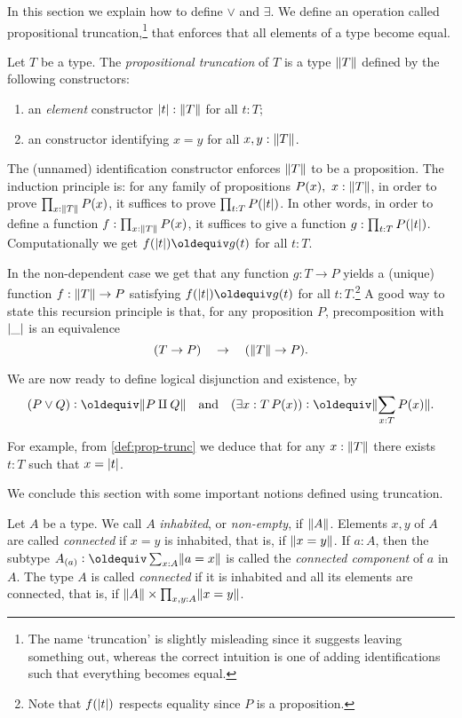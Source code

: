 In this section we explain how to define $\vee$ and $\exists$.
We define an operation called propositional truncation,\footnote{%
The name `truncation' is slightly misleading since it suggests leaving
something out, whereas the correct intuition is one of adding identifications
such that everything becomes equal.}
that enforces that all elements of a type become equal.

\begin{definition}\label{def:prop-trunc}
Let $T$ be a type. The \emph{propositional truncation} of $T$
is a type  $\lVert T\rVert$ defined by the following constructors:
\begin{enumerate}
\item an \emph{element} constructor $\lvert t\rvert : \lVert T\rVert$ for all $t:T$;
\item an constructor identifying $x=y$  for all $x,y:\lVert T\rVert$.
\end{enumerate}
The (unnamed) identification constructor enforces $\lVert T\rVert$ to be a
proposition. The induction principle is: 
for any family of propositions $P(x),~x:\lVert T\rVert$, 
in order to prove $\prod_{x:\lVert T\rVert} P(x)$,
it suffices to prove $\prod_{t:T} P(\lvert t\rvert)$. In other
words, in order to define a function $f:\prod_{x:\lVert T\rVert} P(x)$,
it suffices to give a function $g: \prod_{t:T} P(\lvert t\rvert)$.
Computationally we get $f(\trunc{t})\jdeq g(t)$ for all $t:T$. 
\end{definition}

In the non-dependent case we get that
any function $g: T\to P$ yields a (unique) function $f:\lVert T\rVert\to P$ 
satisfying $f(\trunc{t})\jdeq g(t)$ for all $t:T$.\footnote{%
Note that $f(\lvert t\rvert)$ respects equality since $P$ is a proposition.}
A good way to state this recursion principle is that, 
for any proposition $P$, precomposition with $\lvert\_\rvert$ is an equivalence
\[
(T \to P) \quad \to \quad (\lVert T\rVert \to P).
\]

We are now ready to define logical disjunction and existence, by
\[
(P \vee Q) \defeq \Trunc{P \amalg Q} \quad\text{and}
\quad (\exists x:T\,P(x)) \defeq \Trunc{\sum_{x:T}P(x)}.
\]

For example, from \cref{def:prop-trunc} we deduce that for any $x:\lVert T\rVert$ there exists $t:T$ such that $x=\lvert t\rvert$.

We conclude this section with some important notions defined using truncation.

\begin{definition}\label{def:connected}
Let $A$ be a type. We call $A$ \emph{inhabited},
or \emph{non-empty}, if $\lVert A\rVert$.
Elements $x,y$ of $A$ are called \emph{connected} if $x=y$ is
inhabited, that is, if $\lVert x=y\rVert$.
If $a:A$, then the subtype $A_{(a)}\defeq \sum_{x:A}\Trunc{a=x}$
is called the \emph{connected component} of $a$ in $A$.
The type $A$ is called \emph{connected} if it is inhabited
and all its elements are connected, that is, if 
$\lVert A\rVert \times \prod_{x,y:A} \lVert x=y\rVert$.
\end{definition}

